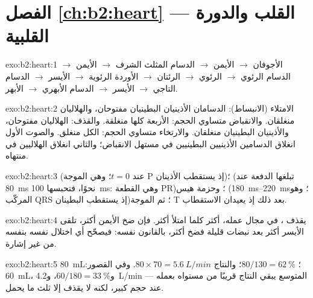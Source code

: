 \section*{الفصل \ref{ch:b2:heart} --- القلب والدورة القلبية}

\begin{solution}{exo:b2:heart:1}
الأجوفان $\to$  الأيمن $\to$ الدسام المثلث الشرف $\to$ 
الأيمن $\to$ الدسام الرئوي $\to$  الرئوي $\to$ الرئتان
$\to$ الأوردة الرئوية $\to$  الأيسر $\to$ الدسام التاجي $\to$ 
الأيسر $\to$ الدسام الأبهري $\to$ الأبهر.
\end{solution}

\begin{solution}{exo:b2:heart:2}
الامتلاء (الانبساط): الدسامان الأذينيان البطينيان مفتوحان، والهلاليان
منغلقان. والانقباض متساوي الحجم: الأربعة كلها منغلقة. والقذف:
الهلاليان مفتوحان، والأذينيان البطينيان منغلقان. والارتخاء متساوي
الحجم: الكل منغلق. والصوت الأول انغلاق الدسامين الأذينيين
البطينيين في مستهل الانقباض؛ والثاني انغلاق الهلاليين في منتهاه.
\end{solution}

\begin{solution}{exo:b2:heart:3}
 (عند $t = 0$؛ وهي الموجة P إذ يستقطب
الأذينان)؛  (تبلغها الدفعة عند \qty{80}{ms}
نحوًا، فتحبسها \qty{100}{ms}: وهي القطعة PR)؛ وحزمة هيس  (\qtyrange{180}{220}{ms}؛ وهو المركّب QRS إذ يستقطب
البطينان)؛ ثم الموجة T بعد ذلك إذ يعيدان الاستقطاب.
\end{solution}

\begin{solution}{exo:b2:heart:4}
يقذف ، في مجال عمله، أكثر كلما امتلأ أكثر.
فإن ضخ  الأيمن أكثر، تلقى الأيسر أكثر بعد نبضات
قليلة فضخ أكثر، بالقانون نفسه: فيصحّح أي اختلال
نفسه بنفسه من غير إشارة.
\end{solution}

\begin{solution}{exo:b2:heart:5}
 \qty{80}{mL}؛  $80/130 = \qty{62}{\%}$؛
والنتاج $80\times 70 = \qty{5.6}{L/min}$. وفي القصور: \qty{60}{mL}،
و$60/180 = \qty{33}{\%}$، و\qty{4.2}{L/min} ---  المتوسع
يبقي النتاج قريبًا من مستواه بعمله عند حجم كبير، لكنه
لا يقذف إلا ثلث ما يحمل.
\end{solution}

